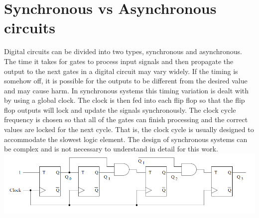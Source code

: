 \documentclass[12pt]{report}
\begin{document}
\section{Synchronous vs Asynchronous circuits}
Digital circuits can be divided into two types, synchronous and asynchronous.  The time it takes for gates to process input signals and then propagate the output to the next gates in a digital circuit may vary widely.  If the timing is somehow off, it is possible for the outputs to be different from the desired value and may cause harm. In synchronous systems this timing variation is dealt with by using a global clock.  The clock is then fed into each flip flop so that the flip flop outputs will lock and update the signals synchronously. The clock cycle frequency is chosen so that all of the gates can finish processing and the correct values are locked for the next cycle. That is, the clock cycle is usually designed to accommodate the slowest logic element. The design of synchronous systems can be complex and is not necessary to understand in detail for this work. \\
\includegraphics[width=\textwidth]{syncex}
\end{document}
